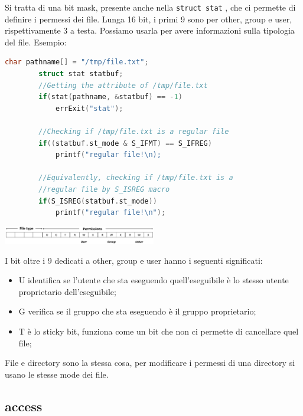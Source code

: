 \documentclass[a4paper, 12pt]{book}
\begin{document}
    Si tratta di una bit mask, presente anche nella \verb|struct stat|
    , che ci permette di definire i permessi dei file. 
    Lunga 16 bit, i primi 9 sono per other, group e user, 
    rispettivamente 3 a testa. Possiamo usarla per avere 
    informazioni sulla tipologia del file. Esempio:
    \begin{lstlisting}[language=C]
        char pathname[] = "/tmp/file.txt";
        struct stat statbuf;
        //Getting the attribute of /tmp/file.txt
        if(stat(pathname, &statbuf) == -1)
            errExit("stat");

        //Checking if /tmp/file.txt is a regular file
        if((statbuf.st_mode & S_IFMT) == S_IFREG)
            printf("regular file!\n);

        //Equivalently, checking if /tmp/file.txt is a 
        //regular file by S_ISREG macro
        if(S_ISREG(statbuf.st_mode))
            printf("regular file!\n");
    \end{lstlisting}
    \begin{center}
        \includegraphics[width=0.5\textwidth]{st_mode.png}
    \end{center}
    I bit oltre i 9 dedicati a other, group e user hanno 
    i seguenti significati:
    \begin{itemize}
        \item U identifica se l'utente che sta eseguendo quell'eseguibile è lo stesso utente proprietario dell'eseguibile;
        \item G verifica se il gruppo che sta eseguendo è il gruppo proprietario;
        \item T è lo sticky bit, funziona come un bit che non ci permette di cancellare quel file;
    \end{itemize}
    File e directory sono la stessa cosa, per modificare i permessi 
    di una directory si usano le stesse mode dei file.

    \subsection{access}
\end{document}
